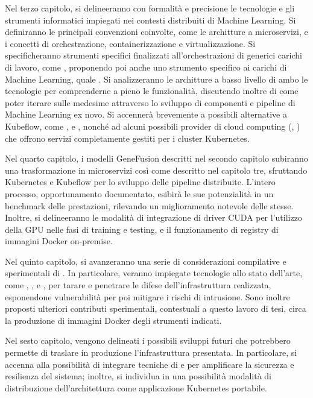 Nel terzo capitolo, si delineeranno con formalità e precisione le tecnologie e gli strumenti informatici impiegati nei contesti distribuiti di Machine Learning. Si definiranno le principali convenzioni coinvolte, come le architture a microservizi, e i concetti di orchestrazione, containerizzazione e virtualizzazione. Si specificheranno strumenti specifici finalizzati all'orchestrazioni di generici carichi di lavoro, come , proponendo poi anche uno strumento specifico ai carichi di Machine Learning, quale . Si analizzeranno le architture a basso livello di ambo le tecnologie per comprenderne a pieno le funzionalità, discutendo inoltre di come poter iterare sulle medesime attraverso lo sviluppo di componenti e pipeline di Machine Learning ex novo. Si accennerà brevemente a possibili alternative a Kubeflow, come ,  e , nonché ad alcuni possibili provider di cloud computing (, ) che offrono servizi completamente gestiti per i cluster Kubernetes.

Nel quarto capitolo, i modelli GeneFusion descritti nel secondo capitolo subiranno una trasformazione in microservizi così come descritto nel capitolo tre, sfruttando Kubernetes e Kubeflow per lo sviluppo delle pipeline distribuite. L'intero processo, opportunamento documentato, esibirà le sue potenzialità in un benchmark delle prestazioni, rilevando un miglioramento notevole delle stesse. Inoltre, si delineeranno le modalità di integrazione di driver CUDA per l'utilizzo della GPU nelle fasi di training e testing, e il funzionamento di registry di immagini Docker on-premise.

Nel quinto capitolo, si avanzeranno una serie di considerazioni compilative e sperimentali di . In particolare, veranno impiegate tecnologie allo stato dell'arte, come , ,  e , per tarare e penetrare le difese dell'infrastruttura realizzata, esponendone vulnerabilità per poi mitigare i rischi di intrusione. Sono inoltre proposti ulteriori contributi sperimentali, contestuali a questo lavoro di tesi, circa la produzione di immagini Docker degli strumenti indicati. 

Nel sesto capitolo, vengono delineati i possibili sviluppi futuri che potrebbero permette di traslare in produzione l'infrastruttura presentata. In particolare, si accenna alla possibilità di integrare tecniche di  e  per amplificare la sicurezza e resilienza del sistema; inoltre, si individua in  una possibilità modalità di distribuzione dell'architettura come applicazione Kubernetes portabile.

